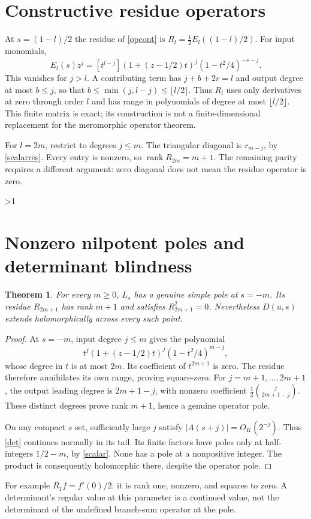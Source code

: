 \documentclass[10pt]{article}
\newtheorem{theorem}{Theorem}
\newcommand{\rank}{\operatorname{rank}}
\begin{document}
\section{Constructive residue operators}
At $s=(1-l)/2$ the residue of \eqref{opcont} is
$R_l=\tfrac12 E_l((1-l)/2)$.
For input monomials,
\begin{equation}\label{coeff}
 E_l(s)z^j=[t^{l-j}](1+(z-1/2)t)^j(1-t^2/4)^{-s-j}.
\end{equation}
This vanishes for $j>l$. A contributing term has
$j+b+2r=l$ and output degree at most $b\le j$, so that
$b\le\min(j,l-j)\le\lfloor l/2\rfloor$.
Thus $R_l$ uses only derivatives at zero through order $l$ and has range
in polynomials of degree at most $\lfloor l/2\rfloor$.
This finite matrix is exact; its construction is not a finite-dimensional
replacement for the meromorphic operator theorem.

For $l=2m$, restrict to degrees $j\le m$.
The triangular diagonal is $r_{m-j}$, by \eqref{scalarres}.
Every entry is nonzero, so $\rank R_{2m}=m+1$.
The remaining parity requires a different argument: zero diagonal
does not mean the residue operator is zero.
\fi

\ifnum\CRevisionRound>1
\section{Nonzero nilpotent poles and determinant blindness}
\begin{theorem}\label{nilpotent}
For every $m\ge0$, $L_s$ has a genuine simple pole at $s=-m$.
Its residue $R_{2m+1}$ has rank $m+1$ and satisfies $R_{2m+1}^2=0$.
Nevertheless $D(u,s)$ extends holomorphically across every such point.
\end{theorem}
\begin{proof}
At $s=-m$, input degree $j\le m$ gives the polynomial
\[
 t^j(1+(z-1/2)t)^j(1-t^2/4)^{m-j},
\]
whose degree in $t$ is at most $2m$. Its coefficient of $t^{2m+1}$ is zero.
The residue therefore annihilates its own range, proving square-zero.
For $j=m+1,\ldots,2m+1$, the output leading degree is $2m+1-j$,
with nonzero coefficient $\frac12\binom{j}{2m+1-j}$.
These distinct degrees prove rank $m+1$, hence a genuine operator pole.

On any compact $s$ set, sufficiently large $j$ satisfy
$|A(s+j)|=O_K(2^{-j})$. Thus \eqref{det} continues normally in its tail.
Its finite factors have poles only at half-integers $1/2-m$, by
\eqref{scalar}. None has a pole at a nonpositive integer.
The product is consequently holomorphic there, despite the operator pole.
\end{proof}
For example $R_1 f=f'(0)/2$: it is rank one, nonzero, and squares to zero.
A determinant's regular value at this parameter is a continued value,
not the determinant of the undefined branch-sum operator at the pole.
\end{document}
